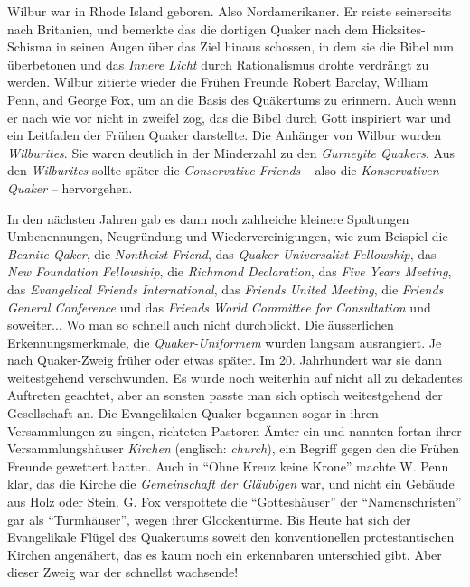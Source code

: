 \medskip

Wilbur war in Rhode Island geboren. Also Nordamerikaner. Er reiste seinerseits
nach Britanien, und bemerkte das die dortigen Quaker nach dem Hicksites-Schisma
in seinen Augen über das Ziel hinaus schossen, in dem sie die Bibel nun
überbetonen und das \textit{Innere Licht} durch Rationalismus drohte verdrängt
zu werden. Wilbur zitierte wieder die Frühen Freunde Robert Barclay, William
Penn, and George Fox, um an die Basis des Quäkertums zu erinnern. Auch wenn er
nach wie vor nicht in zweifel zog, das die Bibel durch Gott inspiriert war und
ein Leitfaden der Frühen Quaker darstellte. Die Anhänger von Wilbur wurden
\textit{Wilburites}. Sie waren deutlich in der Minderzahl zu den
\textit{Gurneyite Quakers}. Aus den \textit{Wilburites} sollte später die
\textit{Conservative Friends} -- also die \textit{Konservativen Quaker} --
hervorgehen.

\medskip

In den nächsten Jahren gab es dann noch zahlreiche kleinere Spaltungen
Umbenennungen, Neugründung und Wiedervereinigungen, wie zum Beispiel die \textit{Beanite Qaker}, die \textit{Nontheist Friend}, das \textit{Quaker Universalist Fellowship}, das \textit{New Foundation Fellowship}, die \textit{Richmond Declaration}, das \textit{Five Years Meeting}, das \textit{Evangelical Friends International}, das \textit{Friends United Meeting}, die \textit{Friends General Conference} und das \textit{Friends World Committee for Consultation} und soweiter... Wo man so schnell auch nicht durchblickt.
Die äusserlichen Erkennungsmerkmale, die \textit{Quaker-Uniformem} wurden
langsam ausrangiert. Je nach Quaker-Zweig früher oder etwas später. Im 20.
Jahrhundert war sie dann weitestgehend verschwunden. Es wurde noch weiterhin auf
nicht all zu dekadentes Auftreten geachtet, aber an sonsten passte man sich
optisch weitestgehend der Gesellschaft an. Die Evangelikalen Quaker begannen
sogar in ihren Versammlungen zu singen, richteten Pastoren-Ämter ein und nannten
fortan ihrer Versammlungshäuser \textit{Kirchen} (englisch: \textit{church}),
ein Begriff gegen den die Frühen Freunde gewettert hatten. Auch in "`Ohne Kreuz
keine Krone"' machte W. Penn klar, das die Kirche die \textit{Gemeinschaft der
Gläubigen} war, und nicht ein Gebäude aus Holz oder Stein. G. Fox verspottete
die "`Gotteshäuser"' der "`Namenschristen"' gar als "`Turmhäuser"', wegen ihrer
Glockentürme. Bis Heute hat sich der Evangelikale Flügel des Quakertums soweit
den konventionellen protestantischen Kirchen angenähert, das es kaum noch ein
erkennbaren unterschied gibt. Aber dieser Zweig war der schnellst wachsende!

